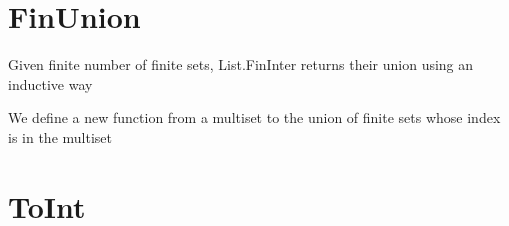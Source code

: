 \begin{definition}\label{FinInter₀}

\end{definition}

\begin{lemma}\label{eq_FinInter₀}

\end{lemma}

\section{FinUnion}

\begin{definition}\label{List.FinUnion}
  \leanok
          Given finite number of finite sets, List.FinInter returns their union using an inductive way
\end{definition}

\begin{lemma}\label{List.eq_FinUnion}

\end{lemma}

\begin{definition}\label{Multiset.FinUnion}
          We define a new function from a multiset to the union of finite sets whose index is in the multiset
\end{definition}

\begin{lemma}\label{Multiset.eq_FinUnion}
\end{lemma}

\begin{definition}\label{FinUnion₀}

\end{definition}

\begin{lemma}\label{eq_FinUnion₀}

\end{lemma}

\section{ToInt}

